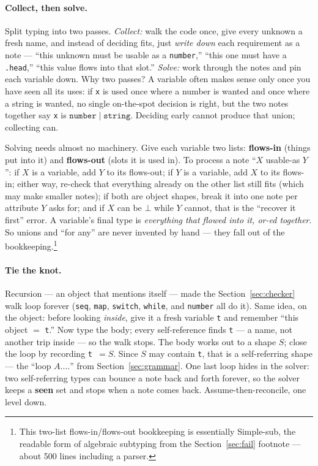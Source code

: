 \documentclass[10pt]{article}
\newcommand{\ty}[1]{\mathtt{#1}}     %
\begin{document}
\paragraph{Collect, then solve.} Split typing into two passes. \emph{Collect:}
walk the code once, give every unknown a fresh name, and instead of deciding
fits, just \emph{write down} each requirement as a note --- ``this unknown must
be usable as a \verb|number|,'' ``this one must have a \verb|.head|,'' ``this
value flows into that slot.'' \emph{Solve:} work through the notes and pin each
variable down. Why two passes? A variable often makes sense only once you have
seen all its uses: if \verb|x| is used once where a number is wanted and once
where a string is wanted, no single on-the-spot decision is right, but the two
notes together say \verb|x| is $\ty{number}\mid\ty{string}$. Deciding early
cannot produce that union; collecting can.

Solving needs almost no machinery. Give each variable two lists:
\textbf{flows-in} (things put into it) and \textbf{flows-out} (slots it is used
in). To process a note ``$X$ usable-as $Y$'': if $X$ is a variable, add $Y$ to
its flows-out; if $Y$ is a variable, add $X$ to its flows-in; either way,
re-check that everything already on the other list still fits (which may make
smaller notes); if both are object shapes, break it into one note per attribute
$Y$ asks for; and if $X$ can be $\bot$ while $Y$ cannot, that is the ``recover
it first'' error. A variable's final type is \emph{everything that flowed into
it, or-ed together}. So unions and ``for any'' are never invented by hand ---
they fall out of the bookkeeping.\footnote{This two-list flows-in/flows-out
bookkeeping is essentially Simple-sub, the readable form of algebraic subtyping
from the Section~\ref{sec:fail} footnote --- about 500 lines including a parser.}

\paragraph{Tie the knot.} Recursion --- an object that mentions itself --- made
the Section~\ref{sec:checker} walk loop forever (\verb|seq|, \verb|map|,
\verb|switch|, \verb|while|, and \verb|number| all do it). Same idea, on the
object: before looking \emph{inside}, give it a fresh variable \verb|t| and
remember ``this object $=$ \verb|t|.'' Now type the body; every self-reference
finds \verb|t| --- a name, not another trip inside --- so the walk stops. The
body works out to a shape $S$; close the loop by recording \verb|t|~$=S$. Since
$S$ may contain \verb|t|, that is a self-referring shape --- the ``loop
$A.\dots$'' from Section~\ref{sec:grammar}. One last loop hides in the solver:
two self-referring types can bounce a note back and forth forever, so the solver
keeps a \textbf{seen} set and stops when a note comes back. Assume-then-reconcile,
one level down.
\end{document}
